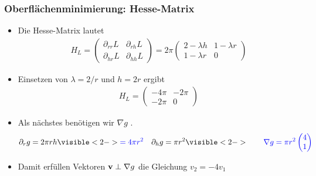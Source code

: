 \begin{frame}
  \frametitle<presentation>{Oberflächenminimierung: Hesse-Matrix}
  \begin{itemize}
  \item Die Hesse-Matrix lautet
    \begin{gather*}
      H_L =
      \begin{pmatrix}
        \partial_{rr} L & \partial_{rh} L\\
        \partial_{hr} L & \partial_{hh} L
      \end{pmatrix}
      = 2\pi
      \begin{pmatrix}
        2-\lambda h & 1-\lambda r\\
        1-\lambda r & 0
      \end{pmatrix}
    \end{gather*}
  \item Einsetzen von $\lambda=2/r$ und $h=2r$ ergibt
    \begin{gather*}
      H_L =
      \begin{pmatrix}
        -4\pi & -2\pi\\
        -2\pi & 0
      \end{pmatrix}
    \end{gather*}
  \item Als nächstes benötigen wir $\nabla g$ .
    \begin{gather*}
      \partial_r g = 2\pi r h \visible<2->{{\color{blue}=4\pi r^2}}
      \quad \partial_h g = \pi r^2
      \visible<2->{{\color{blue}\qquad\nabla g = \pi r^2
          \begin{pmatrix}
            4\\1
          \end{pmatrix}
        }}
    \end{gather*}
  \item<2-> Damit erfüllen Vektoren $\mathbf{v}\perp\nabla g$ die Gleichung $v_2 = -4v_1$
  \end{itemize}
\end{frame}

